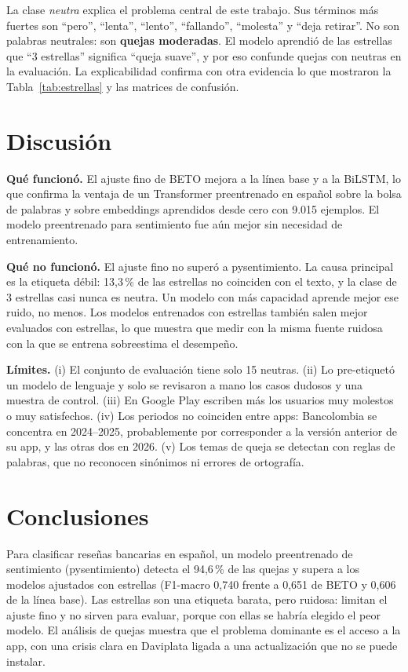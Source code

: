 \documentclass[conference]{IEEEtran}
\begin{document}
La clase \emph{neutra} explica el problema central de este trabajo. Sus términos más fuertes son ``pero'',
``lenta'', ``lento'', ``fallando'', ``molesta'' y ``deja retirar''. No son palabras neutrales: son \textbf{quejas
moderadas}. El modelo aprendió de las estrellas que ``3 estrellas'' significa ``queja suave'', y por eso confunde
quejas con neutras en la evaluación. La explicabilidad confirma con otra evidencia lo que mostraron la
Tabla~\ref{tab:estrellas} y las matrices de confusión.

\section{Discusión}
\textbf{Qué funcionó.} El ajuste fino de BETO mejora a la línea base y a la BiLSTM, lo que confirma la ventaja
de un Transformer preentrenado en español sobre la bolsa de palabras y sobre embeddings aprendidos desde cero con
9.015 ejemplos. El modelo preentrenado para sentimiento fue aún mejor sin necesidad de entrenamiento.

\textbf{Qué no funcionó.} El ajuste fino no superó a pysentimiento. La causa principal es la etiqueta débil: 13,3\,\%
de las estrellas no coinciden con el texto, y la clase de 3 estrellas casi nunca es neutra. Un modelo con más capacidad
aprende mejor ese ruido, no menos. Los modelos entrenados con estrellas también salen mejor evaluados con estrellas, lo que
muestra que medir con la misma fuente ruidosa con la que se entrena sobreestima el desempeño.

\textbf{Límites.} (i) El conjunto de evaluación tiene solo 15 neutras. (ii) Lo pre-etiquetó un modelo de lenguaje y
solo se revisaron a mano los casos dudosos y una muestra de control. (iii) En Google Play escriben más los usuarios
muy molestos o muy satisfechos. (iv) Los periodos no coinciden entre apps: Bancolombia se concentra en 2024--2025,
probablemente por corresponder a la versión anterior de su app, y las otras dos en 2026. (v) Los temas de queja se detectan con reglas de palabras,
que no reconocen sinónimos ni errores de ortografía.

\section{Conclusiones}
Para clasificar reseñas bancarias en español, un modelo preentrenado de sentimiento (pysentimiento) detecta el
94,6\,\% de las quejas y supera a los modelos ajustados con estrellas (F1-macro 0,740 frente a 0,651 de BETO y
0,606 de la línea base). Las estrellas son una etiqueta barata, pero ruidosa: limitan el ajuste fino y no sirven
para evaluar, porque con ellas se habría elegido el peor modelo. El análisis de quejas muestra que el problema
dominante es el acceso a la app, con una crisis clara en Daviplata ligada a una actualización que no se puede instalar.
\end{document}
